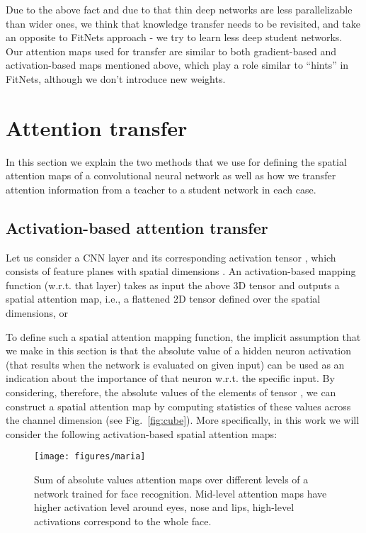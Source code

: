 \documentclass{article} \usepackage{iclr2017_conference}
\begin{document}
Due to the above fact and due to that thin deep networks are less parallelizable than wider ones, we think that knowledge transfer needs to be revisited, and take an opposite to FitNets approach - we try to learn less deep student networks. Our attention maps used for transfer are similar to both gradient-based and activation-based  maps mentioned above, which play a role similar to ``hints'' in FitNets, although we don't introduce new weights.



\section{Attention transfer}\label{sec:attention_transfer}
In this section we explain the two methods that we use for defining the spatial attention maps of a convolutional neural network as well as how we transfer  attention information  from a teacher to a student network  in each case.

\subsection{Activation-based attention transfer}

Let us consider a CNN layer and its corresponding activation tensor  , which  consists of  feature planes with spatial dimensions .
An activation-based  mapping function  (w.r.t. that layer) takes as input  the above 3D tensor  and outputs a  spatial attention map, i.e., a flattened 2D tensor defined over the spatial dimensions, or



To define such a spatial  attention mapping function, the implicit  assumption that we make in this section  is that the absolute value of a hidden  neuron activation  (that results when the network is evaluated on given input) can be used as  an indication about  the importance of that neuron w.r.t. the specific input.
By considering, therefore,
the absolute values of the elements of tensor , we can construct a spatial  attention map by computing
 statistics of these values across the channel dimension (see Fig.~\ref{fig:cube}). More specifically, in this work we  will consider the following activation-based spatial attention maps:

\begin{figure}
  \vspace{-0.5cm}
  \centering
  \texttt{[image: figures/maria]}
  \caption{Sum of absolute values attention maps  over different levels of a network trained for face recognition. Mid-level attention maps have higher activation level around eyes, nose and lips, high-level activations correspond to the whole face.}
  \label{figure:vggface_abssum}
\end{figure}
\end{document}
